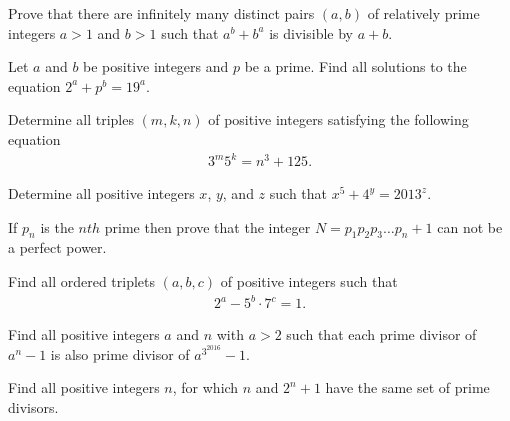 \documentclass{subfile}
\begin{document}
	\begin{problem}[USAMO‌2017] %
		Prove that there are infinitely many distinct pairs $(a, b)$ of relatively prime integers $a>1$ and $b>1$ such that $a^b+b^a$ is divisible by $a+b$.
	\end{problem}

	\begin{problem} %
		Let $a$ and $b$ be positive integers and $p$ be a prime. Find all solutions to the equation $2^a+p^b=19^a$.
	\end{problem}

	\begin{problem} %
		Determine all triples $(m,k,n)$ of positive integers satisfying the following equation
			\begin{align*}
				3^m5^k=n^3+125.
			\end{align*}
	\end{problem}
	
	\begin{problem}[Balkan 2013] %
		Determine all positive integers $x$, $y$, and $z$ such that $x^5 + 4^y = 2013^z$.
	\end{problem}

	\begin{problem} %
		If $p_n$ is the $nth$ prime then prove that the integer $N = p_1p_2p_3 \dots p_n + 1$ can not be a perfect power.
	\end{problem}

	\begin{problem} %
		Find all ordered triplets $(a,b,c)$ of positive integers such that
			\begin{align*}
				2^a-5^{b}\cdot 7^{c} = 1.
			\end{align*}
	\end{problem}

	\begin{problem} %
		Find all positive integers $a$ and $n$ with $a>2$ such that each prime divisor of $a^n-1$ is also prime divisor of $a^{3^{2016}}-1$.
	\end{problem}
	
	\begin{problem} %
		Find all positive integers $n$, for which $n$ and $2^n + 1$ have the same set of prime divisors.
	\end{problem}
\end{document}
